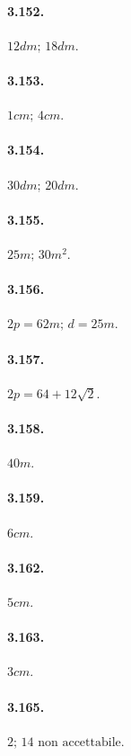\begin{multicols}{3}
\paragraph{3.152.}$ 12\unit{dm};\, 18\unit{dm} $.

\paragraph{3.153.}$ 1\unit{cm};\, 4\unit{cm} $.

\paragraph{3.154.}$ 30\unit{dm};\, 20\unit{dm}$.

\paragraph{3.155.}$25\unit{m};\, 30\unit{m^2} $.

\paragraph{3.156.}$ 2p=62\unit{m};\, d=25\unit{m} $.

\paragraph{3.157.}$ 2p = 64 + 12 \sqrt{2} $.

\paragraph{3.158.}$ 40\unit{m} $.

\paragraph{3.159.}$ 6\unit{cm} $.

\paragraph{3.162.}$ 5\unit{cm} $.

\paragraph{3.163.}$ 3\unit{cm} $.

\paragraph{3.165.}$ 2;\, 14\text{ non accettabile} $.


\end{multicols}
